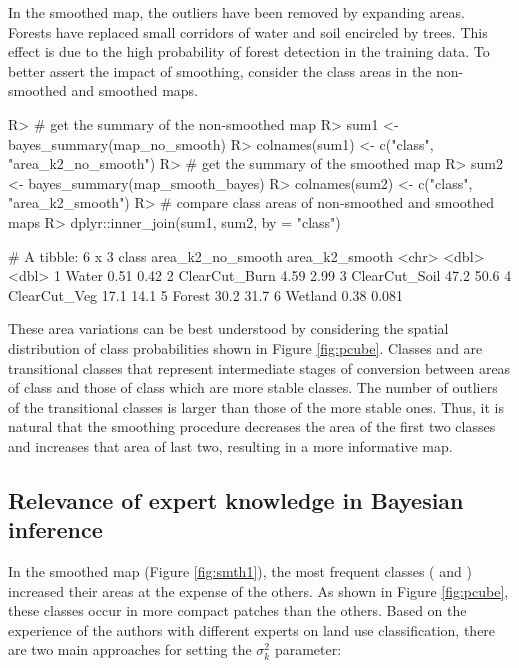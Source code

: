 \documentclass[
  shortnames]{jss}
\begin{document}
In the smoothed map, the outliers have been removed by expanding  areas. Forests have replaced small corridors of water and soil encircled by trees. This effect is due to the high probability of forest detection in the training data. To better assert the impact of smoothing, consider the class areas in the non-smoothed and smoothed maps.

\begin{CodeChunk}
\begin{CodeInput}
R> # get the summary of the non-smoothed map
R> sum1 <- bayes_summary(map_no_smooth)
R> colnames(sum1) <- c("class", "area_k2_no_smooth")
R> # get the summary of the smoothed map
R> sum2 <- bayes_summary(map_smooth_bayes)
R> colnames(sum2) <- c("class", "area_k2_smooth")
R> # compare class areas of non-smoothed and smoothed maps
R> dplyr::inner_join(sum1, sum2, by = "class")
\end{CodeInput}
\begin{CodeOutput}
# A tibble: 6 x 3
  class         area_k2_no_smooth area_k2_smooth
  <chr>                     <dbl>          <dbl>
1 Water                      0.51          0.42 
2 ClearCut_Burn              4.59          2.99 
3 ClearCut_Soil             47.2          50.6  
4 ClearCut_Veg              17.1          14.1  
5 Forest                    30.2          31.7  
6 Wetland                    0.38          0.081
\end{CodeOutput}
\end{CodeChunk}

These area variations can be best understood by considering the spatial distribution of class probabilities shown in Figure \ref{fig:pcube}. Classes  and  are transitional classes that represent intermediate stages of conversion between areas of class  and those of class  which are more stable classes. The number of outliers of the transitional classes is larger than those of the more stable ones. Thus, it is natural that the smoothing procedure decreases the area of the first two classes and increases that area of last two, resulting in a more informative map.

\subsection{Relevance of expert knowledge in Bayesian inference}\label{relevance-of-expert-knowledge-in-bayesian-inference}

In the smoothed map (Figure \ref{fig:smth1}), the most frequent classes ( and ) increased their areas at the expense of the others. As shown in Figure \ref{fig:pcube}, these classes occur in more compact patches than the others. Based on the experience of the authors with different experts on land use classification, there are two main approaches for setting the \(\sigma^2_{k}\) parameter:
\end{document}
